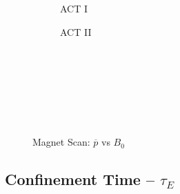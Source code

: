 \begin{figure*}[h!]
\begin{subfigure}[t]{0.45\textwidth}
\begin{adjustbox}{width=\textwidth}
      \Large
      
    \end{adjustbox}
        \caption{ACT I}
    \end{subfigure}
    \hfill
    \begin{subfigure}[t]{0.45\textwidth}
        \centering
    \begin{adjustbox}{width=\textwidth}
      \Large
      
    \end{adjustbox}
        \caption{ACT II}
    \end{subfigure}
    \hfill \hfill ~\\ ~\\ ~\\ ~\\
  \caption[]{Magnet Scan: $\overline p$ vs $B_0$} ~\\
\end{figure*}


\clearpage

\newpage

\subsection*{ Confinement Time -- $\tau_E$ }
  \label{subsection:scan_tau_E}

